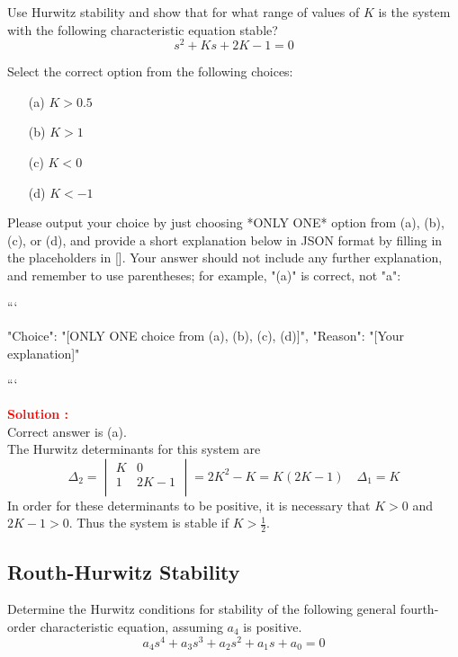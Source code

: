 \documentclass[12pt]{article}
\begin{document}
Use Hurwitz stability and show that for what range of values of \(K\) is the system with the following characteristic equation stable?
\begin{equation}
    s^2 + Ks +2K-1 = 0
\end{equation}

Select the correct option from the following choices:
\begin{itemize}
    \item[(a)] $K>0.5$
    \item[(b)] $K>1$
    \item[(c)] $K<0$
    \item[(d)] $K<-1$
\end{itemize}




Please output your choice by just choosing *ONLY ONE* option from (a), (b), (c), or (d), and provide a short explanation below in JSON format by filling in the placeholders in []. Your answer should not include any further explanation, and remember to use parentheses; for example, "(a)" is correct, not "a":

```

{
"Choice": "[ONLY ONE choice from (a), (b), (c), (d)]",
"Reason": "[Your explanation]"
}

```

\textbf{\textcolor{red}{Solution :}} \\
Correct answer is (a).\\
The Hurwitz determinants for this system are
\begin{equation}
    \Delta_2 = 
\begin{vmatrix}
K & 0 \\
1 & 2K-1 \\
\end{vmatrix} = 2K^2-K = K(2K-1) \quad \Delta_1 = K
\end{equation}
In order for these determinants to be positive, it is necessary that \(K>0\) and \(2K-1>0\). Thus the system is stable if \(K>\frac{1}{2}\).
\clearpage

\subsection{Routh-Hurwitz Stability}

Determine the Hurwitz conditions for stability of the following general fourth-order characteristic equation, assuming \(a_4\) is positive.
\begin{equation}
    a_4s^4 + a_3s^3 + a_2 s^2 + a_1 s + a_0 = 0
\end{equation}
\end{document}
